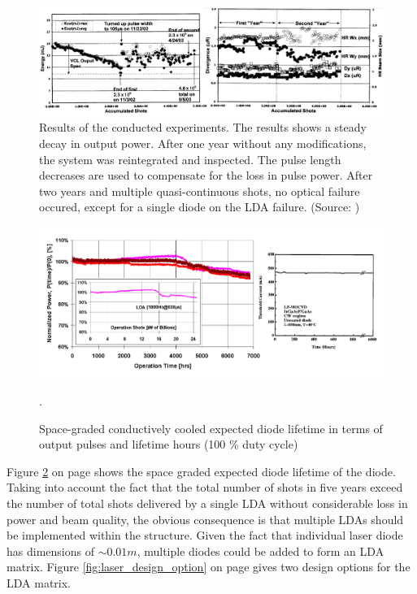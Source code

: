 \begin{figure}[ht!]
\centering
\includegraphics[scale=0.5]{chapters/img/Nd-YAG_reliability.jpg} 
\caption[Results of the conducted experiments]{Results of the conducted experiments. The results shows a steady decay in output power. After one year without any modifications, the system was reintegrated and inspected. The pulse length decreases are used to compensate for the loss in pulse power. After two years and multiple quasi-continuous shots, no optical failure occured, except for a single diode on the \acs{LDA} failure. (Source: \cite{nd_yag_life})}
\label{fig:ndyag_reliability}
\end{figure}

\begin{figure}[ht!]
\centering
\includegraphics[scale=0.4]{chapters/img/diode_lifetime.png} 
\caption{Space-graded conductively cooled expected diode lifetime in terms of output pulses and lifetime hours (100 \% duty cycle)}.
\label{fig:diode_life_time}
\end{figure}

Figure \ref{fig:diode_life_time} on page \pageref{fig:diode_life_time} shows the space graded expected diode lifetime of the diode. Taking into account the fact that the total number of shots in five years exceed the number of total shots delivered by a single \acs{LDA} without considerable loss in power and beam quality, the obvious consequence is that multiple \acp{LDA} should be implemented within the structure. Given the fact that individual \acs{laser} diode has dimensions of $\sim0.01 m$, multiple diodes could be added to form an \acs{LDA} matrix. Figure \ref{fig:laser_design_option} on page \pageref{fig:laser_design_option} gives two design options for the \acs{LDA} matrix. 

